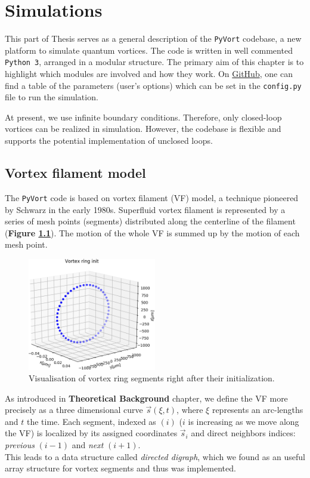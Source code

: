 \chapter{Simulations}

This part of Thesis serves as a general description of the \texttt{PyVort} codebase, a new platform to simulate quantum vortices. The code is written in well commented \texttt{Python 3}, arranged in a modular structure. The primary aim of this chapter is to highlight which modules are involved and how they work.
On \href{https://github.com/KuboBahyl/superfluid}{GitHub}, one can find a table of the parameters (user's options) which can be set in the \texttt{config.py} file to run the simulation.

At present, we use infinite boundary conditions. Therefore, only closed-loop vortices can be realized in simulation. However, the codebase is flexible and supports the potential implementation of unclosed loops.

\section{Vortex filament model}

The \texttt{PyVort} code is based on vortex filament (VF) model, a technique pioneered by Schwarz \cite{schwarz} in the early 1980s. Superfluid vortex filament is represented by a series of mesh points (segments) distributed along the centerline of the filament (\textbf{Figure \ref{example_ring}}). The motion of the whole VF is summed up by the motion of each mesh point.

\begin{figure}[h]
	\centering
	\includegraphics[width=0.5\textwidth]{graphics/simul/ring_init_crop}
	\caption{Visualisation of vortex ring segments right
after their initialization.}
	\label{example_ring}
\end{figure}

As introduced in \textbf{Theoretical Background} chapter, we define the VF more precisely as a three dimensional curve $\vec{s}(\xi, t)$, where $\xi$ represents an arc-lengths and $t$ the time.
Each segment, indexed as $(i)$ ($i$ is increasing as we move along the VF) is localized by its assigned coordinates $\vec{s}_i$ and direct neighbors indices: \textit{previous} $(i-1)$ and \textit{next} $(i+1)$.\\
This leads to a data structure called \textit{directed digraph}, which we found as an useful array structure for vortex segments and thus was implemented.


